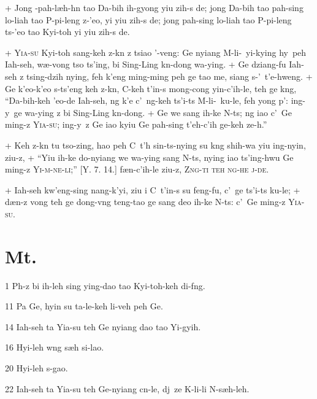 \par
+	Jong \OO-pah-l\ae h-h\e n tao Da-bih ih-gy\y ong yiu zih-s de; jong Da-bih tao pah-sing lo-liah tao P\oo-pi-leng z-'eo,
	yi yiu zih-s de; jong pah-sing lo-liah tao P\oo-pi-leng ts-'eo tao Kyi-toh yi yiu zih-s de.
\par
+	\textsc{Yia-su} Kyi-toh sang-keh z-k\e n z tsiao '\oo-veng: Ge nyiang M\oo-li-\oo\ yi-kying hy\y\ peh Iah-seh,
	w\ae-vong tso ts'ing, bi Sing-Ling k\e n-dong wa-ying.
+	Ge dziang-fu Iah-seh z tsing-dzih nying, feh k'eng ming-ming peh ge tao me, siang s-'\oo\ t'e-hweng.
+	Ge k'eo-k'eo s-ts'eng keh z-k\e n, C\y-keh t'in-s mong-cong yin-c'ih-le, teh ge k\oo ng, ``Da-bih-keh 
	'eo-de Iah-seh, ng k'e c'\y\ ng-keh ts'i-ts M\oo-li-\oo\ ku-le, feh y\y ong p'\oo: ing-y\y\ ge wa-ying
	z bi Sing-Ling k\e n-dong.
+	Ge we sang ih-ke N-ts; ng iao c'\y\ Ge ming-z \textsc{Yia-su}; ing-y\y\ z Ge iao kyiu Ge pah-sing t'eh-c'ih
	ge-keh ze-\oo h.''
\par
+	Keh z-k\e n tu tso-zing, hao peh C\y\ t'\oo h sin-ts-nying su k\oo ng shih-wa yiu ing-nyin, ziu-z,
+	``Yiu ih-ke do-nyiang we wa-ying sang N-ts, nying iao ts'ing-hwu Ge ming-z \textsc{Yi-m\oo-ne-li};'' [Y. 7. 14.]
	f\ae n-c'ih-le ziu-z, \textsc{Z\oo ng-ti teh ng\oo-he j\y-de}.
\par
+	Iah-seh kw'eng-sing nang-k'yi, ziu i C\y\ t'in-s su feng-fu, c'\y\ ge ts'i-ts ku-le;
+	d\ae n-z vong teh ge dong-v\oo ng teng-tao ge sang deo ih-ke N-ts: c'\y\ Ge ming-z \textsc{Yia-su}.



\section{Mt.}%

\begin{sAbstract}
	\item[1] P\oo h-z bi ih-leh sing ying-dao tao Kyi-toh-keh di-f\oo ng.
	\item[11] Pa Ge, hyin su ta-le-keh li-veh peh Ge.
	\item[14] Iah-seh ta Yia-su teh Ge nyiang dao tao Yi-gyih.
	\item[16] Hyi-leh w\oo ng s\ae h si-lao.
	\item[20] Hyi-leh s-gao.
	\item[22] Iah-seh ta Yia-su teh Ge-nyiang c\y n-le, dj\y\ ze K\oo-li-li N\oo-s\ae h-leh.
\end{sAbstract}

